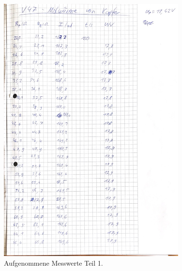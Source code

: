 \newpage
{}
\label{sec:Anhang}

\begin{figure}[h!]
  \centering
  \includegraphics[width=0.85\textwidth]{data/IMG_1281.JPG}
  \caption{Aufgenommene Messwerte Teil 1.}
  \label{fig:messwetrte1}
\end{figure}
